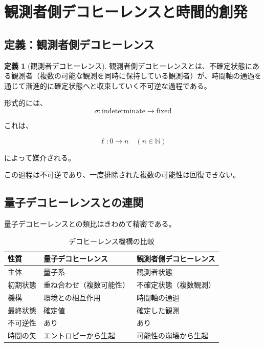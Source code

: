 \documentclass[12pt,a4paper]{article}
\theoremstyle{definition}
\newtheorem{definition}{定義}[section]
\begin{document}
\section{観測者側デコヒーレンスと時間的創発}

\subsection{定義：観測者側デコヒーレンス}

\begin{definition}[観測者デコヒーレンス]
観測者側デコヒーレンスとは、不確定状態にある観測者（複数の可能な観測を同時に保持している観測者）が、時間軸の通過を通じて漸進的に確定状態へと収束していく不可逆な過程である。

形式的には、
\begin{equation}
\sigma : \text{indeterminate} \to \text{fixed}
\end{equation}

これは、

\begin{equation}
\ell : 0 \to n \quad (n \in \mathbb{N})
\end{equation}

によって媒介される。

この過程は不可逆であり、一度排除された複数の可能性は回復できない。
\end{definition}

\subsection{量子デコヒーレンスとの連関}

量子デコヒーレンスとの類比はきわめて精密である。

\begin{table}[htbp]
\centering
\begin{tabularx}{\textwidth}{|l|>{\raggedright\arraybackslash}X|>{\raggedright\arraybackslash}X|}
\hline
\textbf{性質} & \textbf{量子デコヒーレンス} & \textbf{観測者側デコヒーレンス} \\
\hline
主体 & 量子系 & 観測者状態 \\
\hline
初期状態 & 重ね合わせ（複数可能性） & 不確定状態（複数観測） \\
\hline
機構 & 環境との相互作用 & 時間軸の通過 \\
\hline
最終状態 & 確定値 & 確定した観測 \\
\hline
不可逆性 & あり & あり \\
\hline
時間の矢 & エントロピーから生起 & 可能性の崩壊から生起 \\
\hline
\end{tabularx}
\caption{デコヒーレンス機構の比較}
\end{table}
\end{document}
